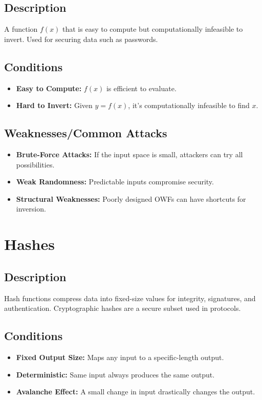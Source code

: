 \documentclass[12pt]{article}
\begin{document}
\subsection*{Description}
A function \(f(x)\) that is easy to compute but computationally infeasible to invert. Used for securing data such as passwords.

\subsection*{Conditions}
\begin{itemize}
    \item \textbf{Easy to Compute:} \(f(x)\) is efficient to evaluate.
    \item \textbf{Hard to Invert:} Given \(y = f(x)\), it’s computationally infeasible to find \(x\).
\end{itemize}

\subsection*{Weaknesses/Common Attacks}
\begin{itemize}
    \item \textbf{Brute-Force Attacks:} If the input space is small, attackers can try all possibilities.
    \item \textbf{Weak Randomness:} Predictable inputs compromise security.
    \item \textbf{Structural Weaknesses:} Poorly designed OWFs can have shortcuts for inversion.
\end{itemize}

\section*{Hashes}
\subsection*{Description}
Hash functions compress data into fixed-size values for integrity, signatures, and authentication. Cryptographic hashes are a secure subset used in protocols.

\subsection*{Conditions}
\begin{itemize}
    \item \textbf{Fixed Output Size:} Maps any input to a specific-length output.
    \item \textbf{Deterministic:} Same input always produces the same output.
    \item \textbf{Avalanche Effect:} A small change in input drastically changes the output.
\end{itemize}
\end{document}
